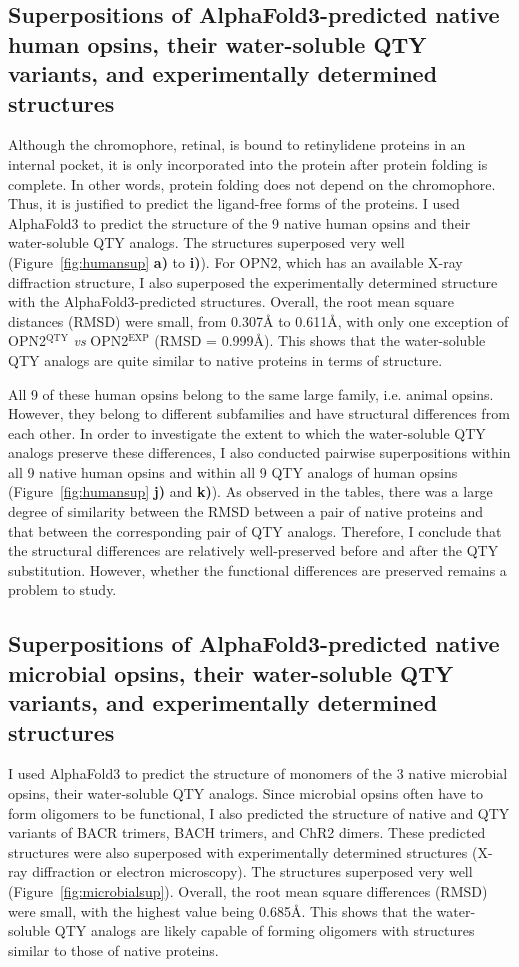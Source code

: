 \documentclass[fleqn, 10pt]{manuscript}
\begin{document}
\subsection*{Superpositions of AlphaFold3-predicted native human opsins, their water-soluble QTY variants, and experimentally determined structures}

Although the chromophore, retinal, is bound to retinylidene proteins in an internal pocket, it is only incorporated into the protein after protein folding is complete. In other words, protein folding does not depend on the chromophore. Thus, it is justified to predict the ligand-free forms of the proteins. I used AlphaFold3 to predict the structure of the 9 native human opsins and their water-soluble QTY analogs. The structures superposed very well (Figure~\ref{fig:humansup} \textbf{a)} to \textbf{i)}). For OPN2, which has an available X-ray diffraction structure, I also superposed the experimentally determined structure with the AlphaFold3-predicted structures. Overall, the root mean square distances (RMSD) were small, from 0.307{\AA} to 0.611\AA, with only one exception of OPN2$^{\textrm{QTY}}$ \textit{vs} OPN2$^{\textrm{EXP}}$ (RMSD = 0.999\AA). This shows that the water-soluble QTY analogs are quite similar to native proteins in terms of structure. 

All 9 of these human opsins belong to the same large family, i.e. animal opsins. However, they belong to different subfamilies and have structural differences from each other. In order to investigate the extent to which the water-soluble QTY analogs preserve these differences, I also conducted pairwise superpositions within all 9 native human opsins and within all 9 QTY analogs of human opsins (Figure~\ref{fig:humansup} \textbf{j)} and \textbf{k)}). As observed in the tables, there was a large degree of similarity between the RMSD between a pair of native proteins and that between the corresponding pair of QTY analogs. Therefore, I conclude that the structural differences are relatively well-preserved before and after the QTY substitution. However, whether the functional differences are preserved remains a problem to study. 

\subsection*{Superpositions of AlphaFold3-predicted native microbial opsins, their water-soluble QTY variants, and experimentally determined structures}

I used AlphaFold3 to predict the structure of monomers of the 3 native microbial opsins, their water-soluble QTY analogs. Since microbial opsins often have to form oligomers to be functional, I also predicted the structure of native and QTY variants of BACR trimers, BACH trimers, and ChR2 dimers. These predicted structures were also superposed with experimentally determined structures (X-ray diffraction or electron microscopy). The structures superposed very well (Figure~\ref{fig:microbialsup}). Overall, the root mean square differences (RMSD) were small, with the highest value being 0.685\AA. This shows that the water-soluble QTY analogs are likely capable of forming oligomers with structures similar to those of native proteins. 
\end{document}
